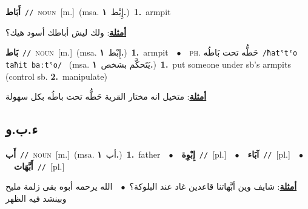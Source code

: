 \documentclass[10pt,a4paper,twoside]{article} %
\begin{document}
\begin{multicols}{2}
{\setlength\topsep{0pt}\textbf{\foreignlanguage{arabic}{أَبَاط}}\ {\color{gray}\texttt{//}\color{black}}\ \textsc{noun}\ [m.]\ \color{gray}(msa. \foreignlanguage{arabic}{إِبْط}~\foreignlanguage{arabic}{\textbf{١.}})\color{black}\ \textbf{1.}~armpit\  \begin{flushright}\color{gray}\foreignlanguage{arabic}{\textbf{\underline{\foreignlanguage{arabic}{أمثلة}}}: ولك ليش أباطك أسود هيك؟}\end{flushright}\color{black}} \vspace{2mm}

{\setlength\topsep{0pt}\textbf{\foreignlanguage{arabic}{بَاط}}\ {\color{gray}\texttt{//}\color{black}}\ \textsc{noun}\ [m.]\ \color{gray}(msa. \foreignlanguage{arabic}{إِبْط}~\foreignlanguage{arabic}{\textbf{١.}})\color{black}\ \textbf{1.}~armpit\ \ $\bullet$\ \ \textsc{ph.} \color{gray} \foreignlanguage{arabic}{حَطُّه تحت بَاطُه}\color{black}\ {\color{gray}\texttt{/{\sffamily ħatˤtˤo taħit baːtˤo}/}\color{black}}\ \color{gray} (msa. \foreignlanguage{arabic}{يَتَحكَّم بشخص}~\foreignlanguage{arabic}{\textbf{١.}})\color{black}\ \textbf{1.}~put someone under sb's armpits (control sb.  \textbf{2.}~manipulate)\  \begin{flushright}\color{gray}\foreignlanguage{arabic}{\textbf{\underline{\foreignlanguage{arabic}{أمثلة}}}: متخيل انه مختار القرية حَطُّه تحت باطُه بكل سهولة}\end{flushright}\color{black}} \vspace{2mm}

\vspace{-3mm}
\subsection*{\color{blue}\foreignlanguage{arabic}{ء.ب.و}\color{blue}{}} 

{\setlength\topsep{0pt}\textbf{\foreignlanguage{arabic}{أَب}}\ {\color{gray}\texttt{//}\color{black}}\ \textsc{noun}\ [m.]\ \color{gray}(msa. \foreignlanguage{arabic}{أب}~\foreignlanguage{arabic}{\textbf{١.}})\color{black}\ \textbf{1.}~father\ \ $\bullet$\ \ \setlength\topsep{0pt}\textbf{\foreignlanguage{arabic}{إِبْوِة}}\ {\color{gray}\texttt{//}\color{black}}\ [pl.]\ \ $\bullet$\ \ \setlength\topsep{0pt}\textbf{\foreignlanguage{arabic}{آبَاء}}\ {\color{gray}\texttt{//}\color{black}}\ [pl.]\ \ $\bullet$\ \ \setlength\topsep{0pt}\textbf{\foreignlanguage{arabic}{أَبَّهَات}}\ {\color{gray}\texttt{//}\color{black}}\ [pl.]\  \begin{flushright}\color{gray}\foreignlanguage{arabic}{\textbf{\underline{\foreignlanguage{arabic}{أمثلة}}}: شايف وين أبَّهاتنا قاعدين غاد عند البلوكة؟\ $\bullet$\ \  الله يرحمه أبوه بقى زلمة مليح وبينشد فيه الظهر}\end{flushright}\color{black}} \vspace{2mm}


\end{multicols}
\end{document}
